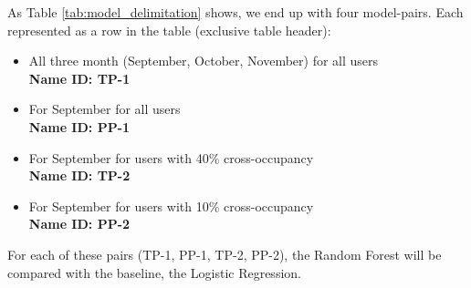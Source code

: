 As Table \ref{tab:model_delimitation} shows, we end up with four model-pairs. Each represented as a row in the table (exclusive table header): 
\begin{itemize}
\item All three month (September, October, November) for all users\\ \textbf{Name ID: TP-1}
\item For September for all users\\ \textbf{Name ID: PP-1}
\item For September for users with 40\% cross-occupancy\\ \textbf{Name ID: TP-2}
\item For September for users with 10\% cross-occupancy\\ \textbf{Name ID: PP-2}
\end{itemize}

For each of these pairs (TP-1, PP-1, TP-2, PP-2), the Random Forest will be compared with the baseline, the Logistic Regression. 

